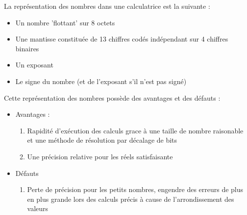 \documentclass[svgnames]{report}
\begin{document}
La représentation des nombres dans une calculatrice est la suivante : 
\begin{itemize}
    \item Un nombre 'flottant' sur 8 octets
    \item Une mantisse constituée de 13 chiffres codés indépendant sur 4 chiffres binaires
    \item Un exposant 
    \item Le signe du nombre (et de l'exposant s'il n'est pas signé) 
\end{itemize}
Cette représentation des nombres possède des avantages et des défauts : 
\begin{itemize}
    \item Avantages : 
    \begin{enumerate}
        \item Rapidité d'exécution des calculs grace à une taille de nombre raisonable et une méthode de résolution par décalage de bits
        \item Une précision relative pour les réels satisfaisante
    \end{enumerate}
    \item{Défauts} 
    \begin{enumerate}
        \item Perte de précision pour les petits nombres, engendre des erreurs de plus en plus grande lors des calculs précis à cause de l'arrondissement des valeurs 
    \end{enumerate}
\end{itemize}
\end{document}
